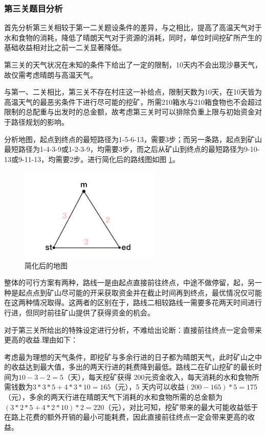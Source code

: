 \documentclass[a4paper]{ctexart}
\begin{document}
\subsubsection{第三关题目分析}

首先分析第三关相较于第一二关题设条件的差异，与之相比，提高了高温天气对于水和食物的消耗，降低了晴朗天气对于资源的消耗，同时，单位时间挖矿所产生的基础收益相对比之前一二关显著降低。

第三关的天气状况在未知的条件下给出了一定的限制，10天内不会出现沙暴天气，故仅需考虑晴朗与高温天气。

与第一、二关相比，第三关不存在村庄这一补给点，限制天数为10天，在10天皆为高温天气的最恶劣条件下进行尽可能的挖矿，所需210箱水与210箱食物也不会超过限制的总配重与出发时的总金额，故考虑第三关时可以排除负重上限与初始资金对于路径规划的影响。

分析地图，起点到终点的最短路径为1-5-6-13，需要3步；而另一条路，起点到矿山最短路径为1-4-3-9或1-2-3-9，均需要3步，而之后从矿山到终点的最短路径为9-10-13或9-11-13，均需要2步。进行简化后的路线图如图 \ref{fig:simplified3}。

\begin{figure}[htpb]
    \centering
    \includegraphics[width=0.6\textwidth]{./pictures/stage3_simplelified.png}
    \caption{简化后的地图}
    \label{fig:simplified3}
\end{figure}
 
整体的可行方案有两种，路线一是由起点直接前往终点，中途不做停留，起，另一种是起点点到矿山尽可能的开采获取资金并在截止时间再到终点，最优情况仅可能在这两种情况取得。这两者的区别在于，路线二相较路线一需要多花两天时间进行行进，但同时前往矿山提供了获得资金的机会。

对于第三关所给出的特殊设定进行分析，不难给出论断：直接前往终点一定会带来更高的收益.理由如下：

考虑最为理想的天气条件，即挖矿与多余行进的日子都为晴朗天气，此时矿山之中的收益达到最大值，多出的两天行进的耗费降到最低。路线二在矿山挖矿的最长时间为$10-3-2=5$（天），每天挖矿获得 200元资金收入，每天消耗的水和食物所需钱数为$3*3*5+4*3*10=165$（元），5 天内可以收益$(200-165)*5=175$（元），多余的两天行进在晴朗天气下消耗的水和食物所需的总金额为 $(3*2*5+4*2*10)*2=220$（元），对比可知，挖矿带来的最大可能收益低于在路上花费的额外开销的最小可能耗费，因此直接前往终点一定会带来更高的收益。
\end{document}
